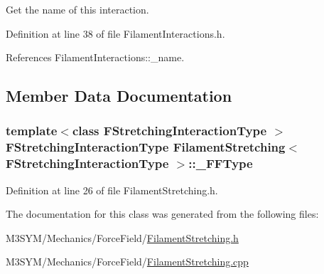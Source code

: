 Get the name of this interaction. 



Definition at line 38 of file Filament\+Interactions.\+h.



References Filament\+Interactions\+::\+\_\+name.



\subsection{Member Data Documentation}
\hypertarget{classFilamentStretching_adbac4d42333a286d19b98f9147f259a9}{
\subsubsection[{\+\_\+\+F\+F\+Type}]{\setlength{\rightskip}{0pt plus 5cm}template$<$class F\+Stretching\+Interaction\+Type $>$ F\+Stretching\+Interaction\+Type {\bf Filament\+Stretching}$<$ F\+Stretching\+Interaction\+Type $>$\+::\+\_\+\+F\+F\+Type\hspace{0.3cm}{\ttfamily [private]}}}\label{classFilamentStretching_adbac4d42333a286d19b98f9147f259a9}


Definition at line 26 of file Filament\+Stretching.\+h.



The documentation for this class was generated from the following files\+:\begin{DoxyCompactItemize}
\item 
M3\+S\+Y\+M/\+Mechanics/\+Force\+Field/\hyperlink{FilamentStretching_8h}{Filament\+Stretching.\+h}\item 
M3\+S\+Y\+M/\+Mechanics/\+Force\+Field/\hyperlink{FilamentStretching_8cpp}{Filament\+Stretching.\+cpp}\end{DoxyCompactItemize}
